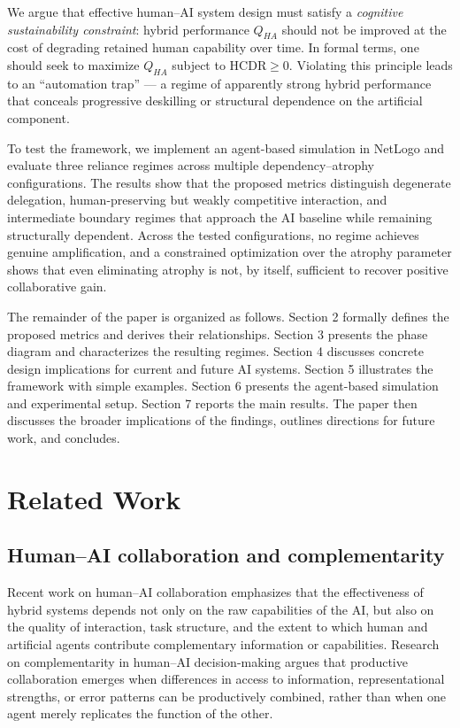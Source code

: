 \documentclass[11pt,a4paper]{article}
\begin{document}
We argue that effective human--AI system design must satisfy a \emph{cognitive sustainability constraint}: hybrid performance $Q_{HA}$ should not be improved at the cost of degrading retained human capability over time. In formal terms, one should seek to maximize $Q_{HA}$ subject to $\text{HCDR} \geq 0$. Violating this principle leads to an ``automation trap'' --- a regime of apparently strong hybrid performance that conceals progressive deskilling or structural dependence on the artificial component.

To test the framework, we implement an agent-based simulation in NetLogo and evaluate three reliance regimes across multiple dependency--atrophy configurations. The results show that the proposed metrics distinguish degenerate delegation, human-preserving but weakly competitive interaction, and intermediate boundary regimes that approach the AI baseline while remaining structurally dependent. Across the tested configurations, no regime achieves genuine amplification, and a constrained optimization over the atrophy parameter shows that even eliminating atrophy is not, by itself, sufficient to recover positive collaborative gain.

The remainder of the paper is organized as follows. Section 2 formally defines the proposed metrics and derives their relationships. Section 3 presents the phase diagram and characterizes the resulting regimes. Section 4 discusses concrete design implications for current and future AI systems. Section 5 illustrates the framework with simple examples. Section 6 presents the agent-based simulation and experimental setup. Section 7 reports the main results. The paper then discusses the broader implications of the findings, outlines directions for future work, and concludes.

\section{Related Work}

\subsection{Human--AI collaboration and complementarity}

Recent work on human--AI collaboration emphasizes that the effectiveness of hybrid systems depends not only on the raw capabilities of the AI, but also on the quality of interaction, task structure, and the extent to which human and artificial agents contribute complementary information or capabilities. Research on complementarity in human--AI decision-making argues that productive collaboration emerges when differences in access to information, representational strengths, or error patterns can be productively combined, rather than when one agent merely replicates the function of the other.
\end{document}
